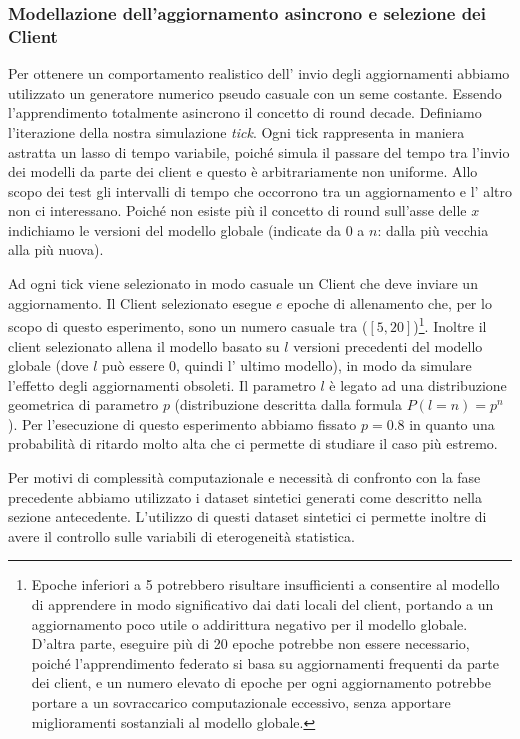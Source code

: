 \documentclass[a4paper, oneside, openright]{report}
\begin{document}
\subsubsection*{Modellazione dell'aggiornamento asincrono e selezione dei Client}
Per ottenere un comportamento realistico dell' invio degli aggiornamenti abbiamo utilizzato un generatore numerico pseudo casuale con un seme costante. Essendo l'apprendimento totalmente asincrono il concetto di round decade. Definiamo l'iterazione della nostra simulazione \textit{tick}. Ogni tick rappresenta in maniera astratta un lasso di tempo variabile, poiché simula il passare del tempo tra l'invio dei modelli da parte dei client e questo è arbitrariamente non uniforme. Allo scopo dei test gli intervalli di tempo che occorrono tra un aggiornamento e l' altro non ci interessano. Poiché non esiste più il concetto di round sull'asse delle $x$ indichiamo le versioni del modello globale (indicate da $0$ a $n$: dalla più vecchia alla più nuova). 

Ad ogni tick viene selezionato in modo casuale un Client che deve inviare un aggiornamento. Il Client selezionato esegue $e$ epoche di allenamento che, per lo scopo di questo esperimento, sono un numero casuale tra ($[5,20]$)\footnote{Epoche inferiori a 5 potrebbero risultare insufficienti a consentire al modello di apprendere in modo significativo dai dati locali del client, portando a un aggiornamento poco utile o addirittura negativo per il modello globale. D'altra parte, eseguire più di 20 epoche potrebbe non essere necessario, poiché l'apprendimento federato si basa su aggiornamenti frequenti da parte dei client, e un numero elevato di epoche per ogni aggiornamento potrebbe portare a un sovraccarico computazionale eccessivo, senza apportare miglioramenti sostanziali al modello globale. }. Inoltre il client selezionato allena il modello basato su $l$ versioni precedenti del modello globale (dove $l$ può essere $0$, quindi l' ultimo modello), in modo da simulare l'effetto degli aggiornamenti obsoleti. Il parametro $l$ è legato ad una distribuzione geometrica di parametro $p$ (distribuzione descritta dalla formula $P(l=n) = p^n$). Per l'esecuzione di questo esperimento abbiamo fissato $p=0.8$ in quanto una probabilità di ritardo molto alta che ci permette di studiare il caso più estremo.

Per motivi di complessità computazionale e necessità di confronto con la fase precedente abbiamo utilizzato i dataset sintetici generati come descritto nella sezione antecedente. L'utilizzo di questi dataset sintetici ci permette inoltre di avere il controllo sulle variabili di eterogeneità statistica.
\end{document}
